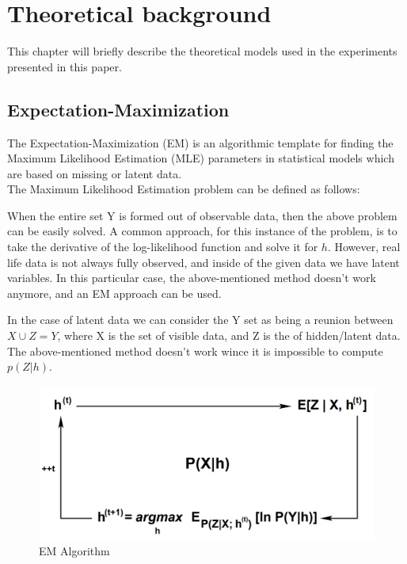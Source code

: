 \chapter{Theoretical background}
\label{TheoreticalBackground}

This chapter will briefly describe the theoretical models used in the experiments presented in this paper.

\section{Expectation-Maximization}
The Expectation-Maximization (EM) is an algorithmic template for finding the Maximum Likelihood Estimation (MLE) parameters in statistical models which are based on missing or latent data.\\
The Maximum Likelihood Estimation problem can be defined as follows:


 When the entire set Y is formed out of observable data, then the above problem can be easily solved. A common approach, for this instance of the problem, is to take the derivative of the log-likelihood function and solve it for $h$. However, real life data is not always fully observed, and inside of the given data we have latent variables. In this particular case, the above-mentioned method doesn't work anymore, and an EM approach can be used.
 
 In the case of latent data we can consider the Y set as being a reunion between $X \cup Z = Y$, where X is the set of visible data, and Z is the of hidden/latent data. The above-mentioned method doesn't work wince it is impossible to compute $p(Z | h)$.
 
 \begin{figure}[H]
 	\includegraphics[width=\textwidth]{Pictures/004EMScheme.png}
 	\caption{EM Algorithm \cite{emCiortuz}}
 	\label{EmScheme}
 \end{figure}
 

